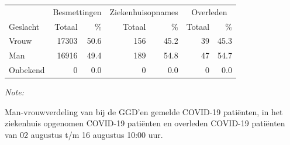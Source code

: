 \documentclass[
  english,
  man,floatsintext]{apa6}
\begin{document}
\begin{table}
\centering\begingroup\fontsize{11}{13}\selectfont

\begin{threeparttable}
\begin{tabular}{lrrrrrr}
\toprule
\multicolumn{1}{c}{ } & \multicolumn{2}{c}{Besmettingen} & \multicolumn{2}{c}{Ziekenhuisopnames} & \multicolumn{2}{c}{Overleden} \\
\cmidrule(l{3pt}r{3pt}){2-3} \cmidrule(l{3pt}r{3pt}){4-5} \cmidrule(l{3pt}r{3pt}){6-7}
Geslacht & Totaal & \% & Totaal & \% & Totaal & \%\\
\midrule
Vrouw & 17303 & 50.6 & 156 & 45.2 & 39 & 45.3\\
Man & 16916 & 49.4 & 189 & 54.8 & 47 & 54.7\\
Onbekend & 0 & 0.0 & 0 & 0.0 & 0 & 0.0\\
\bottomrule
\end{tabular}
\begin{tablenotes}
\item \textit{Note: } 
\item Man-vrouwverdeling van bij de GGD’en gemelde COVID-19 patiënten, in het ziekenhuis opgenomen COVID-19 patiënten en overleden COVID-19 patiënten van 02 augustus t/m 16 augustus 10:00 uur.
\end{tablenotes}
\end{threeparttable}
\endgroup{}
\end{table}
\newpage
\end{document}
